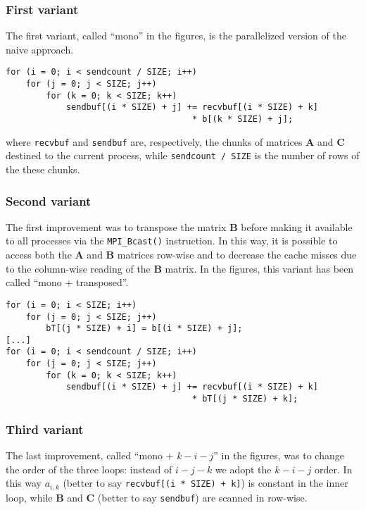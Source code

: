 \documentclass[11pt]{article}
\begin{document}
\subsubsection{First variant}
The first variant, called ``mono'' in the figures, is the parallelized version of the naive approach. 

\begin{verbatim}
for (i = 0; i < sendcount / SIZE; i++)
    for (j = 0; j < SIZE; j++)
        for (k = 0; k < SIZE; k++)
            sendbuf[(i * SIZE) + j] += recvbuf[(i * SIZE) + k] 
                                     * b[(k * SIZE) + j];
\end{verbatim}
where \verb|recvbuf| and \verb|sendbuf| are, respectively, the chunks of matrices $\mathbf{A}$ and $\mathbf{C}$ destined to the current process, while \verb|sendcount / SIZE| is the number of rows of the these chunks.

\subsubsection{Second variant}
The first improvement was to transpose the matrix $\mathbf{B}$ before making it available to all processes via the \verb|MPI_Bcast()| instruction. In this way, it is possible to access both the $\mathbf{A}$ and $\mathbf{B}$ matrices row-wise and to decrease the cache misses due to the column-wise reading of the $\mathbf{B}$ matrix. In the figures, this variant has been called ``mono + transposed''.

\begin{verbatim}
for (i = 0; i < SIZE; i++)
    for (j = 0; j < SIZE; j++)
        bT[(j * SIZE) + i] = b[(i * SIZE) + j];
[...]
for (i = 0; i < sendcount / SIZE; i++)
    for (j = 0; j < SIZE; j++)
        for (k = 0; k < SIZE; k++)
            sendbuf[(i * SIZE) + j] += recvbuf[(i * SIZE) + k] 
                                     * bT[(j * SIZE) + k];
\end{verbatim}

\subsubsection{Third variant}
The last improvement, called ``mono + $k - i - j$'' in the figures, was to change the order of the three loops: instead of $i - j - k$ we adopt the $k - i - j$ order. In this way $a_{i,k}$ (better to say \verb|recvbuf[(i * SIZE) + k]|) is constant in the inner loop, while $\mathbf{B}$ and $\mathbf{C}$ (better to say \verb|sendbuf|) are scanned in row-wise. 
\end{document}
